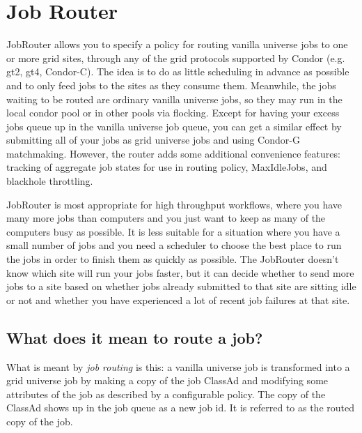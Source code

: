 \section{\label{sec:JobRouter}Job Router}

JobRouter allows you to specify a policy for routing vanilla universe
jobs to one or more grid sites, through any of the grid protocols
supported by Condor (e.g. gt2, gt4, Condor-C). The idea is to do as
little scheduling in advance as possible and to only feed jobs to the
sites as they consume them. Meanwhile, the jobs waiting to be routed
are ordinary vanilla universe jobs, so they may run in the local
condor pool or in other pools via flocking. Except for having your
excess jobs queue up in the vanilla universe job queue, you can get a
similar effect by submitting all of your jobs as grid universe jobs
and using Condor-G matchmaking.  However, the router adds some
additional convenience features: tracking of aggregate job states for
use in routing policy, MaxIdleJobs, and blackhole throttling.

JobRouter is most appropriate for high throughput workflows, where you
have many more jobs than computers and you just want to keep as many
of the computers busy as possible.  It is less suitable for a
situation where you have a small number of jobs and you need a
scheduler to choose the best place to run the jobs in order to finish
them as quickly as possible.  The JobRouter doesn't know which site
will run your jobs faster, but it can decide whether to send more jobs
to a site based on whether jobs already submitted to that site are
sitting idle or not and whether you have experienced a lot of recent
job failures at that site.

\subsection{What does it mean to route a job?}

What is meant by \textit{job routing} is this: a vanilla universe job is
transformed into a grid universe job by making a copy of the job
ClassAd and modifying some attributes of the job as described by a
configurable policy.  The copy of the ClassAd shows up in the job
queue as a new job id.  It is referred to as the routed copy of the
job.

